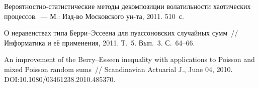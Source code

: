 \begin{multicols}{2}
{{\begin{thebibliography}{99}
 Ве\-ро\-ят\-но\-ст\-но-ста\-ти\-сти\-че\-ские методы
декомпозиции волатильности хаотических процессов.~--- М.: Изд-во Московского ун-та, 2011. 510~с.

 О неравенствах типа Бер\-ри--Эс\-се\-ена для
пуассоновских случайных сумм~// Информатика и её применения, 2011.
Т.~5. Вып.~3. С.~64--66.

\label{end\stat}

 An improvement of the Berry--Esseen
inequality with applications to Poisson and mixed Poisson random
sums~// Scandinavian Actuarial J., June 04, 2010.
DOI:10.1080/03461238.2010.485370.
 \end{thebibliography}
}
}


\end{multicols}